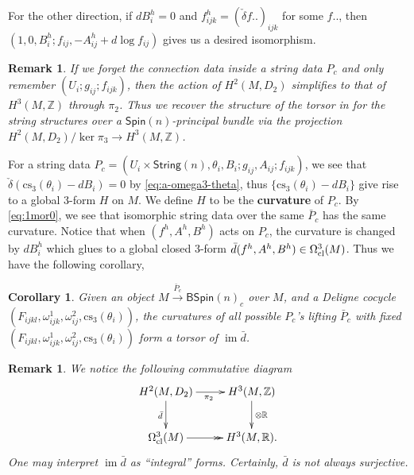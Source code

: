 \documentclass[letterpaper,10pt, oneside]{article} %
\newtheorem{cor}[thm]{Corollary}
\newtheorem{rmk}[thm]{Remark}
\newcommand{\String}{\mathsf{String}}%
\newcommand{\Spin}{\mathsf{Spin}}%
\newcommand{\BSpin}{\mathsf{BSpin}}%
\DeclareMathOperator{\im}{im}
\newcommand{\cs}{\mathrm{cs}}
\newcommand{\R}{\mathbb R}\newcommand{\Z}{\mathbb Z}
\def\qed{\hfill ~\vrule height6pt width6pt depth0pt}
\begin{document}
For the other direction,  if $dB^h_i=0$ and $f^h_{ijk}=(\check{\delta} f..)_{ijk}$ for some $f..$, then $(1, 0, B^h_i; f_{ij}, -A^h_{ij}+d\log f_{ij})$ gives us a desired isomorphism.
\qed
\begin{rmk}\label{rmk:compare-wo-conn}
If we forget the connection data inside a string data $P_c$ and only remember $(U_i; g_{ij}; f_{ijk})$, then the action of $H^2(M, D_2)$ simplifies to that of $H^3(M, \Z)$ through $\pi_2$. Thus we recover the structure of the torsor in \cite{stolz-teichner:elliptic-obj} for the string structures over a $\Spin(n)$-principal bundle via the projection $H^2(M, D_2)/\ker \pi_3\to H^3(M, \Z)$.
\end{rmk}

For a string data $P_c= (U_i\times \String(n), \theta_i, B_i; g_{ij}, A_{ij}; f_{ijk})$, we see that $\check{\delta}(\cs_3(\theta_i) - dB_i)=0$ by \eqref{eq:a-omega3-theta}, thus $\{\cs_3(\theta_i) - dB_i\}$ give rise to a global 3-form $H$ on $M$.  We define $H$ to be the {\bf curvature} of $P_c$. By \eqref{eq:1mor0}, we see that isomorphic string data over the same $\bar{P}_c$ has the same curvature. Notice that when $(f^h, A^h, B^h)$ acts on $P_c$, the curvature is changed by $dB^h_i$ which glues to a global closed 3-form $\bar{d}(f^h, A^h, B^h)\in \Omega_{\rm cl}^3(M)$. Thus we have the following corollary,

\begin{cor}\label{cor:curv}
Given an object $M\xrightarrow{\bar{P}_c} \BSpin(n)_c$ over $M$, and a Deligne cocycle $(F_{ijkl}, \omega^1_{ijk}, \omega^2_{ij}, \cs_3(\theta_i))$, the curvatures of all possible $P_c$'s lifting $\bar{P}_c$ with fixed $(F_{ijkl}, \omega^1_{ijk}, \omega^2_{ij}, \cs_3(\theta_i))$ form a torsor of $\im \bar{d}$.
\end{cor}
\begin{rmk}\label{rmk:curv} %
We notice the following commutative diagram
\begin{equation}\label{eq:d2-z}
\xymatrix{
H^2(M, D_2) \ar[r]_{\pi_2} \ar[d]_{\bar{d}} & H^3(M, \Z) \ar[d]^{\otimes \R} \\
\Omega^3_{\rm cl}(M) \ar@{->>}[r] & H^3(M, \R).
}
\end{equation}
One may interpret $\im \bar{d}$ as ``integral'' forms. Certainly, $\bar{d}$ is not always surjective.
\end{rmk}
\end{document}
